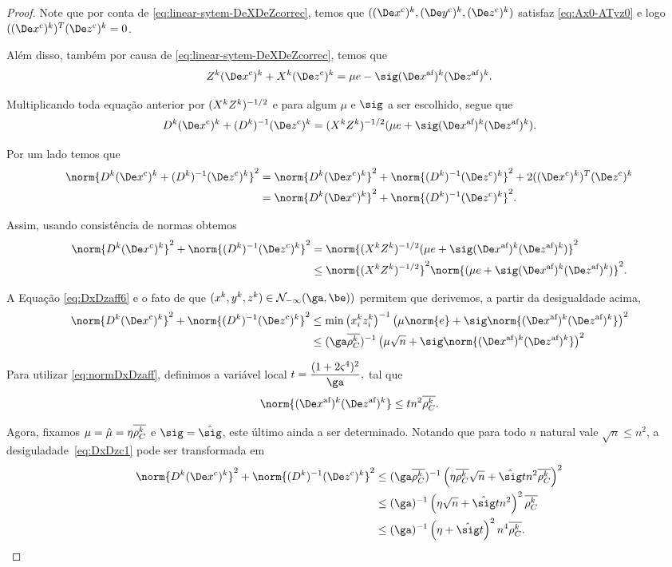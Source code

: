\begin{proof}
	Note que por conta de \eqref{eq:linear-sytem-DeXDeZcorrec}, temos que $(\Dekcox,\Dekcoy,\Dekcoz)$ satisfaz \eqref{eq:Ax0-ATyz0} e logo $(\Dekcox)^{T}\Dekcoz = 0 $. 

	


	Além disso, também por causa de \eqref{eq:linear-sytem-DeXDeZcorrec}, temos que
	\[
	\Zk\Dekcox + \Xk\Dekcoz = \mu e  - \sig \dekx  \dekz .
	\]

	Multiplicando toda equação anterior por $(  X^{k} Z^{k}  )^{-1/2}$ e  para algum $\mu$ e $\sig$ a ser escolhido, segue que 
	\[
		\Dk\Dekcox + \Dik\Dekcoz = (  \Xk \Zk  )^{-1/2}(\mu e + \sig \dekx  \dekz ).
	\] 

	Por um lado temos que 
	\[
		\begin{aligned}
		\norm{\Dk\Dekcox + \Dik\Dekcoz}^{2} & = \norm{\Dk\Dekcox}^{2} + \norm{\Dik\Dekcoz}^{2} + 2(\Dekcox)^{T}\Dekcoz  \\ &= \norm{\Dk\Dekcox}^{2} + \norm{\Dik\Dekcoz}^{2}.
		\end{aligned}
	\]

Assim, usando consistência de normas obtemos
\begin{align*}
	\norm{\Dk\Dekcox}^{2} + \norm{\Dik\Dekcoz}^{2} & = \norm{(  \Xk \Zk  )^{-1/2}(\mu e+ \sig \dekx  \dekz )}^{2} \notag\\ 
												& \leq \norm{(  \Xk \Zk  )^{-1/2}}^{2}\norm{(\mu e+ \sig \dekx  \dekz )}^{2} .	
\end{align*}


 A Equação \eqref{eq:DxDzaff6} e o fato de que  $(\xk,\yk,\zk)\in\Nset_{-\infty}(\ga,\be))$ permitem que derivemos, a partir da desigualdade acima, 
\begin{align}
	\norm{\Dk\Dekcox}^{2} + \norm{\Dik\Dekcoz}^{2} 	& \leq \min\left({\xk_i\zk_i}\right)^{-1}\left(\mu\norm{ e} +{\sig}\norm{ \dekx  \dekz }\right)^{2}\notag\\
												& \leq (\ga\rhoCkb )^{-1}\left(\mu\sqrt{n} +{\sig}\norm{ \dekx  \dekz }\right)^{2} \label{eq:DxDzc1}		
\end{align}

Para utilizar \eqref{eq:normDxDzaff}, definimos a variável local
$
t = \dfrac{(1 + 2\bdxzstar^{4})^{2} }{\ga},
$
tal que 
\[
\norm{ \dekx  \dekz  } \leq t n^{2}\rhoCkb.
\]

Agora, fixamos $\mu = \hat{\mu} =\eta \overline{\rho_C^{k}} $ e $\sig = \nextsig$, este último ainda a ser determinado. Notando que para todo $n$ natural vale $\sqrt{n} \leq n^{2}$, a desiguladade~\eqref{eq:DxDzc1} pode ser transformada em
\[
\begin{aligned}
	\norm{\Dk\Dekcox}^{2} + \norm{\Dik\Dekcoz}^{2}
							& \leq (\ga\rhoCkb )^{-1}\left(\eta\rhoCkb \sqrt{n} +{\nextsig} t n^{2}\rhoCkb \right)^{2}\\
							& \leq (\ga)^{-1}\left(\eta\sqrt{n} +{\nextsig} t n^{2}\right)^{2}\rhoCkb \\
							& \leq (\ga)^{-1}\left(\eta +{\nextsig} t \right)^{2}n^{4}\rhoCkb .
\end{aligned}
\]



\end{proof}

